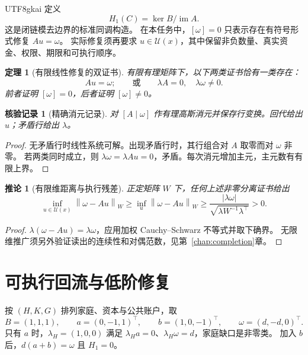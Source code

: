 \documentclass[12pt,a4paper,openany]{report}
\newtheorem{theorem}{定理}[chapter]
\newtheorem{corollary}{推论}[chapter]
\newtheorem{Certificate}{核验记录}[chapter]
\numberwithin{equation}{chapter}
\newcommand{\im}{\operatorname{im}}
\newcommand{\Norm}[1]{\left\lVert#1\right\rVert}
\begin{document}
\begin{CJK*}{UTF8}{gkai}
定义
\[
 H_1(C)=\ker B/\im A.
\]
这是闭链模去边界的标准同调构造\cite[第2章]{Hatcher2002}。
在本任务中，$[\omega]=0$ 只表示存在有符号形式修复 $Au=\omega$。
实际修复须再要求 $u\in\mathcal U(x)$，其中保留非负数量、真实资金、权限、期限和可执行顺序。

\begin{theorem}[有限线性修复的双证书]
\label{thm:dual}
有限有理矩阵下，以下两类证书恰有一类存在：
\[
 Au=\omega;
 \qquad\text{或}\qquad
 \lambda A=0,\quad\lambda\omega\ne0.
\]
前者证明 $[\omega]=0$，后者证明 $[\omega]\ne0$。
\end{theorem}
\begin{Certificate}[精确消元记录]
对 $[A\mid\omega]$ 作有理高斯消元并保存行变换。回代给出 $u$；矛盾行给出 $\lambda$。
\end{Certificate}
\begin{proof}
无矛盾行时线性系统可解。出现矛盾行时，其行组合对 $A$ 取零而对 $\omega$ 非零。
若两类同时成立，则 $\lambda\omega=\lambda Au=0$，矛盾。每次消元增加主元，主元数有有限上界。
\end{proof}

\begin{corollary}[有限维距离与执行残差]
\label{cor:finite-distance}
正定矩阵 $W$ 下，任何上述非零分离证书给出
\[
 \inf_{u\in\mathcal U(x)}\Norm{\omega-Au}_W
 \ge\inf_u\Norm{\omega-Au}_W
 \ge\frac{|\lambda\omega|}{\sqrt{\lambda W^{-1}\lambda^\top}}>0.
\]
\end{corollary}
\begin{proof}
$\lambda(\omega-Au)=\lambda\omega$，应用加权 Cauchy--Schwarz 不等式并取下确界。
无限维推广须另外验证读出的连续性和对偶范数，见第~\ref{chap:completion}章。
\end{proof}

\section{可执行回流与低阶修复}

按 $(H,K,G)$ 排列家庭、资本与公共账户，取
\[
 B=(1,1,1),\qquad
 a=(0,-1,1)^\top,\qquad b=(1,0,-1)^\top,
 \qquad\omega=(d,-d,0)^\top.
\]
只有 $a$ 时，$\lambda_H=(1,0,0)$ 满足 $\lambda_Ha=0$、$\lambda_H\omega=d$，家庭缺口是非零类。
加入 $b$ 后，$d(a+b)=\omega$ 且 $H_1=0$。


\end{CJK*}
\end{document}
